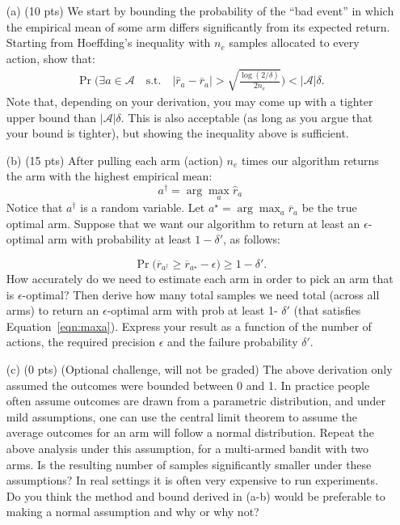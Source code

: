 \documentclass{article}
\begin{document}
\begin{enumerate}
\item[(a) (10 pts)] We start by bounding the probability of the ``bad event'' in which the empirical mean of some arm differs significantly from its expected return. Starting from Hoeffding's inequality with $n_e$ samples allocated to every action, show that:
\begin{align}
\Pr\Bigg(\exists a \in \mathcal{A} \quad \text{s.t.} \quad |\widehat r_a - \overline r_a | > \sqrt{\frac{\log(2/\delta)}{2n_e}}	\Bigg) < |\mathcal{A}|\delta.
\end{align}
Note that, depending on your derivation, you may come up with a tighter upper bound than $|\mathcal{A}|\delta$. This is also acceptable (as long as you argue that your bound is tighter), but showing the inequality above is sufficient.

\item[(b) (15 pts)] After pulling each arm (action) $n_e$ times our algorithm returns the arm with the highest empirical mean:
\begin{equation}
a^\dagger = \arg\max_{a} \widehat r_a	
\end{equation}
Notice that $a^\dagger$ is a random variable.
Let ${a^\star} = \arg\max_a \overline r_{a}$ be the true optimal arm. Suppose that we want our algorithm to return at least an $\epsilon$-optimal arm with probability at least $1-\delta'$, as follows:

\begin{equation}
\label{eqn:maxa}
\Pr \Bigg(\overline r_{a^\dagger} \geq  \overline r_{a^\star} - \epsilon \Bigg) \geq 1-\delta'.
\end{equation}
How accurately do we need to estimate each arm in order to pick an arm that is $\epsilon$-optimal? Then derive how many total samples we need total (across all arms) to return an $\epsilon$-optimal arm with prob at least 1- $\delta'$ (that satisfies Equation~\ref{eqn:maxa}).  Express your result as a function of the number of actions, the required precision $\epsilon$ and the failure probability $\delta'$.

\item[(c) (0 pts)] (Optional challenge, will not be graded) The above derivation only assumed the outcomes were bounded between 0 and 1. In practice people often assume outcomes are drawn from a parametric distribution, and under mild assumptions, one can use the central limit theorem to assume the average outcomes for an arm will follow a normal distribution. Repeat the above analysis under this assumption, for a multi-armed bandit with two arms. Is the resulting number of samples significantly smaller under these assumptions? In real settings it is often very expensive to run experiments. Do you think the method and bound derived in (a-b) would be preferable to making a normal assumption and why or why not? 
\end{enumerate}
\end{document}
